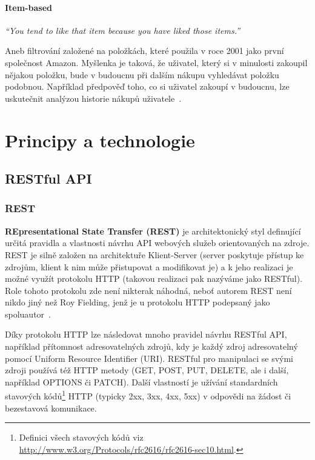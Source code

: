 \documentclass[thesis=M,czech]{FITthesis}[2014/05/07]
\begin{document}
\paragraph{Item-based}

\emph{``You tend to like that item because you have liked those items.''}~\cite{cf}

Aneb filtrování založené na položkách, které použila v roce 2001 jako první společnost Amazon. Myšlenka je taková, že uživatel, který si v minulosti zakoupil nějakou položku, bude v budoucnu při dalším nákupu vyhledávat položku podobnou. Například předpověď toho, co si uživatel zakoupí v budoucnu, lze uskutečnit analýzou historie nákupů uživatele~\cite{itemcf}. 

\section{Principy a technologie}
\label{sec:sysanalys}

\subsection{RESTful API}
\label{rest}
\subsubsection{REST}
\textbf{REpresentational State Transfer (REST)} je architektonický styl definující určitá pravidla a vlastnosti návrhu API webových služeb orientovaných na zdroje. REST je silně založen na architektuře Klient-Server (server poskytuje přístup ke zdrojům, klient k nim může přistupovat a modifikovat je) a k jeho realizaci je možné využít protokolu HTTP (takovou realizaci pak nazýváme jako RESTful). Role tohoto protokolu zde není nikterak náhodná, neboť autorem REST není nikdo jiný než Roy Fielding, jenž je u protokolu HTTP podepsaný jako spoluautor~\cite{Fielding:2000:ASD:932295}. 

Díky protokolu HTTP lze následovat mnoho pravidel návrhu RESTful API, například přítomnost adresovatelných zdrojů, kdy je každý zdroj adresovatelný pomocí Uniform Resource Identifier (URI). RESTful pro manipulaci se svými zdroji používá též HTTP metody (GET, POST, PUT, DELETE, ale i další, například OPTIONS či PATCH). Další vlastností je užívání standardních stavových kódů\footnote{Definici všech stavových kódů viz \url{http://www.w3.org/Protocols/rfc2616/rfc2616-sec10.html}.} HTTP (typicky 2xx, 3xx, 4xx, 5xx) v odpovědi na žádost či bezestavová komunikace.
\end{document}

